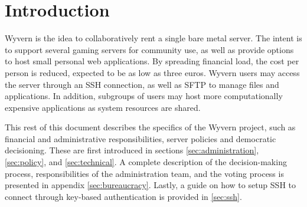 \section{Introduction}
Wyvern is the idea to collaboratively rent a single bare metal server. The intent is to support several gaming servers for community use, as well as provide options to host small personal web applications. By spreading financial load, the cost per person is reduced, expected to be as low as three euros. Wyvern users may access the server through an SSH connection, as well as SFTP to manage files and applications. In addition, subgroups of users may host more computationally expensive applications as system resources are shared.

This rest of this document describes the specifics of the Wyvern project, such as financial and administrative responsibilities, server policies and democratic decisioning. These are first introduced in sections \ref{sec:administration}, \ref{sec:policy}, and \ref{sec:technical}. A complete description of the decision-making process, responsibilities of the administration team, and the voting process is presented in appendix \ref{sec:bureaucracy}. Lastly, a guide on how to setup SSH to connect through key-based authentication is provided in \ref{sec:ssh}.
